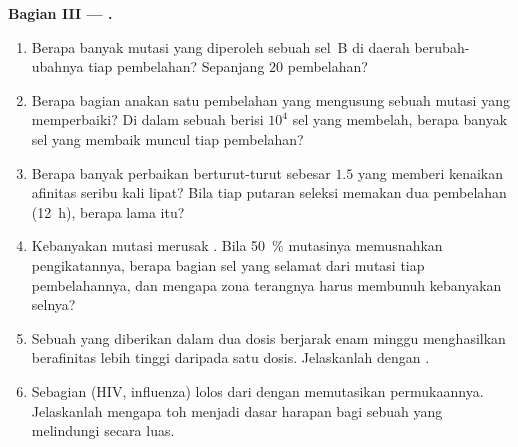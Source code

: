 \begin{problem}
\medskip
\noindent\textbf{Bagian III --- .}
\begin{enumerate}[resume]
  \item Berapa banyak mutasi yang diperoleh sebuah sel~B di daerah berubah-ubahnya
        tiap pembelahan? Sepanjang $20$ pembelahan?
  \item Berapa bagian anakan satu pembelahan yang mengusung sebuah
        mutasi yang memperbaiki? Di dalam sebuah  berisi $10^{4}$ sel
        yang membelah, berapa banyak sel yang membaik muncul tiap pembelahan?
  \item Berapa banyak perbaikan berturut-turut sebesar $1.5$ yang memberi kenaikan
        afinitas seribu kali lipat? Bila tiap putaran seleksi memakan dua
        pembelahan (\qty{12}{h}), berapa lama itu?
  \item Kebanyakan mutasi merusak . Bila \qty{50}{\%} mutasinya
        memusnahkan pengikatannya, berapa bagian sel yang selamat dari mutasi tiap
        pembelahannya, dan mengapa zona terangnya harus membunuh kebanyakan selnya?
  \item Sebuah  yang diberikan dalam dua dosis berjarak enam minggu menghasilkan
         berafinitas lebih tinggi daripada satu dosis. Jelaskanlah dengan .
  \item Sebagian  (HIV, influenza) lolos dari  dengan memutasikan
        permukaannya. Jelaskanlah mengapa  toh
        menjadi dasar harapan bagi sebuah  yang melindungi secara luas.
\end{enumerate}


\end{problem}
